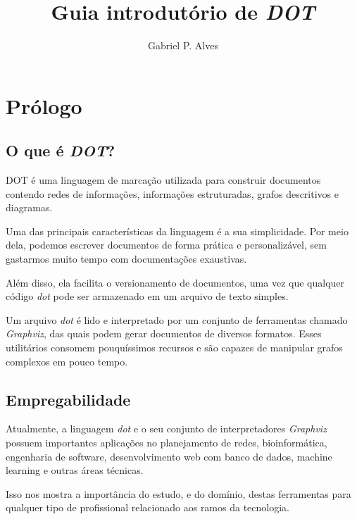 \documentclass[a4paper,12pt]{article}
\begin{document}
  \title{\vspace{-1.5in} Guia introdutório de \emph{DOT}}
  \author{Gabriel P. Alves}
  \date{}
  \maketitle

  \section{Prólogo}

    \subsection{O que é \emph{DOT}?}
      DOT é uma linguagem de marcação
      utilizada para construir documentos
      contendo redes de informações,
      informações estruturadas, grafos
      descritivos e diagramas.

      Uma das principais características da
      linguagem é a sua simplicidade. Por
      meio dela, podemos escrever
      documentos de forma prática e
      personalizável, sem gastarmos muito
      tempo com documentações exaustivas.

      Além disso, ela facilita o
      versionamento de documentos, uma vez
      que qualquer código \emph{dot} pode ser
      armazenado em um arquivo de
      texto simples.

      Um arquivo \emph{dot} é lido e
      interpretado por um conjunto de
      ferramentas chamado \emph{Graphviz},
      das quais podem gerar documentos de
      diversos formatos. Esses utilitários
      consomem pouquíssimos recursos e são
      capazes de manipular grafos complexos
      em pouco tempo.

    \subsection{Empregabilidade}
      Atualmente, a linguagem \emph{dot} e
      o seu conjunto de interpretadores
      \emph{Graphviz} possuem importantes
      aplicações no planejamento de redes,
      bioinformática, engenharia de software,
      desenvolvimento web com banco de dados,
      machine learning e outras áreas técnicas.

      Isso nos mostra a importância do estudo, e do
      domínio, destas ferramentas para qualquer
      tipo de profissional relacionado aos ramos da
      tecnologia.
\end{document}
